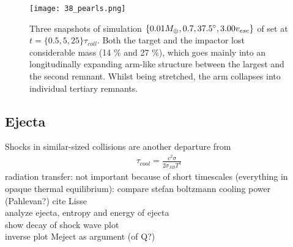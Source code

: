 
\begin{figure}[h!]
\begin{center}
\texttt{[image: 38\_pearls.png]}
\caption{Three snapshots of simulation $\{ 0.01 M_{\oplus}, 0.7, 37.5 ^\circ, 3.00 v_{esc}\}$ of set \css at $t = \{0.5, 5, 25\} \tau_{coll}$. Both the target and the impactor lost considerable mass (14 \% and 27 \%), which goes mainly into an longitudinally expanding arm-like structure between the largest and the second remnant. Whilst being stretched, the arm collapses into individual tertiary remnants.}
\label{ch03_fig38}
\end{center}
\end{figure}



\subsection{Ejecta}
Shocks in similar-sized collisions are another departure from 
\begin{align}
\tau_{cool} = \frac{c^2 \sigma}{ 2 \sigma_{SB} T^4}
\end{align}
\cite{Thompson:1988p3451}
radiation transfer: not important because of short timescales (everything in opaque thermal equilibrium): compare stefan boltzmann cooling power (Pahlevan?)
cite Lisse\\
analyze ejecta, entropy and energy of ejecta \\
show decay of shock wave plot\\ %
inverse plot Meject as argument (of Q?)\\

